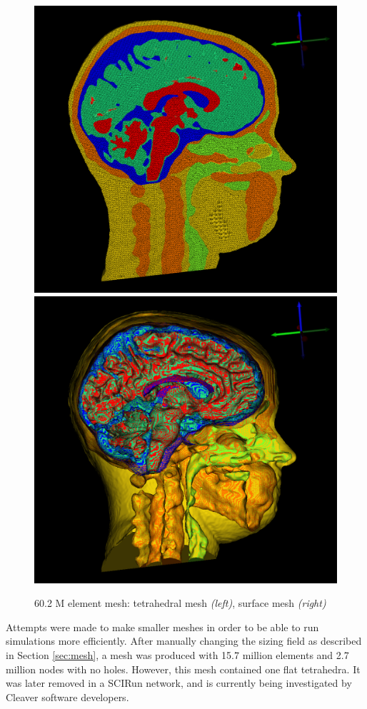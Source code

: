 \begin{figure}[H]
\begin{center}
\includegraphics[width=.49\textwidth]{Figures/bigmesh_1}
\includegraphics[width=.49\textwidth]{Figures/bigmesh_surface}
\caption{60.2 M element mesh: tetrahedral mesh \textit{(left)}, surface mesh \textit{(right)}}
\label{fig:bigmesh}
\end{center}
\end{figure}

Attempts were made to make smaller meshes in order to be able to run simulations more efficiently. After manually changing the sizing field as described in Section \ref{sec:mesh}, a mesh was produced with 15.7 million elements and 2.7 million nodes with no holes. However, this mesh contained one flat tetrahedra. It was later removed in a SCIRun network, and is currently being investigated by Cleaver software developers.

